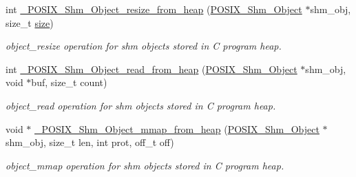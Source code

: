 \begin{DoxyCompactItemize}
int \mbox{\hyperlink{group__POSIXShmPrivate_ga649784e275d805fc2267ee7b53209106}{\+\_\+\+P\+O\+S\+I\+X\+\_\+\+Shm\+\_\+\+Object\+\_\+resize\+\_\+from\+\_\+heap}} (\mbox{\hyperlink{structPOSIX__Shm__Object}{P\+O\+S\+I\+X\+\_\+\+Shm\+\_\+\+Object}} $\ast$shm\+\_\+obj, size\+\_\+t \mbox{\hyperlink{sun4u_2tte_8h_a245260f6f74972558f61b85227df5aae}{size}})
\begin{DoxyCompactList}\small\item\em object\+\_\+resize operation for shm objects stored in C program heap. \end{DoxyCompactList}\item 
\mbox{\label{group__POSIXShmPrivate_ga7038eb90a5c80a4598988a41d9f619c8}} 
int \mbox{\hyperlink{group__POSIXShmPrivate_ga7038eb90a5c80a4598988a41d9f619c8}{\+\_\+\+P\+O\+S\+I\+X\+\_\+\+Shm\+\_\+\+Object\+\_\+read\+\_\+from\+\_\+heap}} (\mbox{\hyperlink{structPOSIX__Shm__Object}{P\+O\+S\+I\+X\+\_\+\+Shm\+\_\+\+Object}} $\ast$shm\+\_\+obj, void $\ast$buf, size\+\_\+t count)
\begin{DoxyCompactList}\small\item\em object\+\_\+read operation for shm objects stored in C program heap. \end{DoxyCompactList}\item 
\mbox{\label{group__POSIXShmPrivate_ga04406b52b1efa0c28fe64c4f480511b4}} 
void $\ast$ \mbox{\hyperlink{group__POSIXShmPrivate_ga04406b52b1efa0c28fe64c4f480511b4}{\+\_\+\+P\+O\+S\+I\+X\+\_\+\+Shm\+\_\+\+Object\+\_\+mmap\+\_\+from\+\_\+heap}} (\mbox{\hyperlink{structPOSIX__Shm__Object}{P\+O\+S\+I\+X\+\_\+\+Shm\+\_\+\+Object}} $\ast$shm\+\_\+obj, size\+\_\+t len, int prot, off\+\_\+t off)
\begin{DoxyCompactList}\small\item\em object\+\_\+mmap operation for shm objects stored in C program heap. \end{DoxyCompactList}\end{DoxyCompactItemize}
